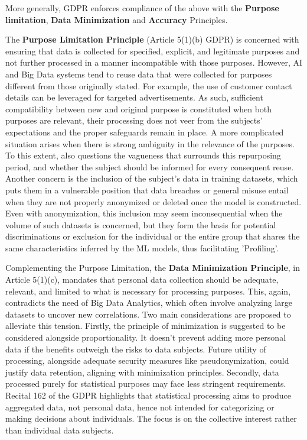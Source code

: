 \documentclass{article}
\begin{document}
More generally, GDPR enforces compliance of the above with the \textbf{Purpose limitation}, \textbf{Data Minimization} and \textbf{Accuracy} Principles.

The \textbf{Purpose Limitation Principle} (Article 5(1)(b) GDPR) is concerned with ensuring that data is collected for specified, explicit, and legitimate purposes and not further processed in a manner incompatible with those purposes. However, AI and Big Data systems tend to reuse data that were collected for purposes different from those originally stated. For example, the use of customer contact details can be leveraged for targeted advertisements. As such, sufficient compatibility between new and original purpose is constituted when both purposes are relevant, their processing does not veer from the subjects' expectations and the proper safeguards remain in place. A more complicated situation arises when there is strong ambiguity in the relevance of the purposes. To this extent, \cite{EUROPEAN_PARLIAMENT_GDPR_ON_AI} also questions the vagueness that surrounds this repurposing period, and whether the subject should be informed for every consequent reuse. Another concern is the inclusion of the subject's data in training datasets, which puts them in a vulnerable position that data breaches or general misuse entail when they are not properly anonymized or deleted once the model is constructed. Even with anonymization, this inclusion may seem inconsequential when the volume of such datasets is concerned, but they form the basis for potential discriminations or exclusion for the individual or the entire group that shares the same characteristics inferred by the ML models, thus facilitating 'Profiling'.

Complementing the Purpose Limitation, the \textbf{Data Minimization Principle}, in Article 5(1)(c), mandates that personal data collection should be adequate, relevant, and limited to what is necessary for processing purposes. This, again, contradicts the need of Big Data Analytics, which often involve analyzing large datasets to uncover new correlations. Two main considerations are proposed to alleviate this tension. Firstly, the principle of minimization is suggested to be considered alongside proportionality. It doesn't prevent adding more personal data if the benefits outweigh the risks to data subjects. Future utility of processing, alongside adequate security measures like pseudonymization, could justify data retention, aligning with minimization principles. Secondly, data processed purely for statistical purposes may face less stringent requirements. Recital 162 of the GDPR highlights that statistical processing aims to produce aggregated data, not personal data, hence not intended for categorizing or making decisions about individuals. The focus is on the collective interest rather than individual data subjects.
\end{document}
